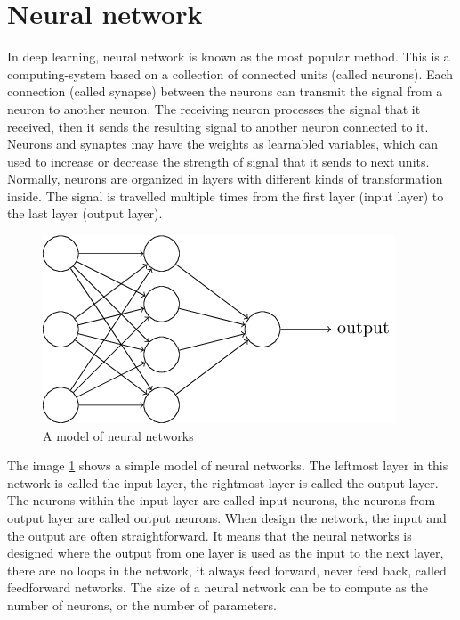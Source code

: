 \section{Neural network}
In deep learning, neural network is known as the most popular method. This is a computing-system based on a collection of connected units (called neurons). Each connection (called synapse) between the neurons can transmit the signal from a neuron to another neuron. The receiving neuron processes the signal that it received, then it sends the resulting signal to another neuron connected to it. Neurons and synaptes may have the weights as learnabled variables, which can used to increase or decrease the strength of signal that it sends to next units. Normally, neurons are organized in layers with different kinds of transformation inside. The signal is travelled multiple times from the first layer (input layer) to the last layer (output layer).

\begin{figure}[h]
	\centering
	\includegraphics[scale=0.5]{images/neuron}
	\caption{A model of neural networks}
	\label{fignnnetworks}
\end{figure}
The image \ref{fignnnetworks} shows a simple model of neural networks. The leftmost layer in this network is called the input layer, the rightmost layer is called the output layer. The neurons within the input layer are called input neurons, the neurons from output layer are called output neurons. When design the network, the input and the output are often straightforward. It means that the neural networks is designed where the output from one layer is used as the input to the next layer, there are no loops in the network, it always feed forward, never feed back, called feedforward networks. The size of a neural network can be to compute as the number of neurons, or the number of parameters.

